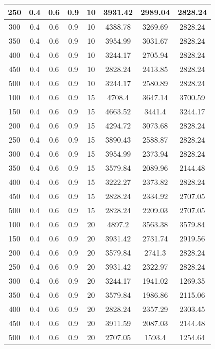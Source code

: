 \documentclass[a4paper, 12pt]{extreport}
\begin{document}
\begin{itemize}
\begin{longtable}{|c|c|c|c|c|c|c|c|}
			250 & 0.4 & 0.6 & 0.9 & 10 & 3931.42 & 2989.04 & 2828.24 \\\hline
			300 & 0.4 & 0.6 & 0.9 & 10 & 4388.78 & 3269.69 & 2828.24 \\\hline
			350 & 0.4 & 0.6 & 0.9 & 10 & 3954.99 & 3031.67 & 2828.24 \\\hline
			400 & 0.4 & 0.6 & 0.9 & 10 & 3244.17 & 2705.94 & 2828.24 \\\hline
			450 & 0.4 & 0.6 & 0.9 & 10 & 2828.24 & 2413.85 & 2828.24 \\\hline
			500 & 0.4 & 0.6 & 0.9 & 10 & 3244.17 & 2580.89 & 2828.24 \\\hline
			100 & 0.4 & 0.6 & 0.9 & 15 & 4708.4 & 3647.14 & 3700.59 \\\hline
			150 & 0.4 & 0.6 & 0.9 & 15 & 4663.52 & 3441.4 & 3244.17 \\\hline
			200 & 0.4 & 0.6 & 0.9 & 15 & 4294.72 & 3073.68 & 2828.24 \\\hline
			250 & 0.4 & 0.6 & 0.9 & 15 & 3890.43 & 2588.87 & 2828.24 \\\hline
			300 & 0.4 & 0.6 & 0.9 & 15 & 3954.99 & 2373.94 & 2828.24 \\\hline
			350 & 0.4 & 0.6 & 0.9 & 15 & 3579.84 & 2089.96 & 2144.48 \\\hline
			400 & 0.4 & 0.6 & 0.9 & 15 & 3222.27 & 2373.82 & 2828.24 \\\hline
			450 & 0.4 & 0.6 & 0.9 & 15 & 2828.24 & 2334.92 & 2707.05 \\\hline
			500 & 0.4 & 0.6 & 0.9 & 15 & 2828.24 & 2209.03 & 2707.05 \\\hline
			100 & 0.4 & 0.6 & 0.9 & 20 & 4897.2 & 3563.38 & 3579.84 \\\hline
			150 & 0.4 & 0.6 & 0.9 & 20 & 3931.42 & 2731.74 & 2919.56 \\\hline
			200 & 0.4 & 0.6 & 0.9 & 20 & 3579.84 & 2741.3 & 2828.24 \\\hline
			250 & 0.4 & 0.6 & 0.9 & 20 & 3931.42 & 2322.97 & 2828.24 \\\hline
			300 & 0.4 & 0.6 & 0.9 & 20 & 3244.17 & 1941.02 & 1269.35 \\\hline
			350 & 0.4 & 0.6 & 0.9 & 20 & 3579.84 & 1986.86 & 2115.06 \\\hline
			400 & 0.4 & 0.6 & 0.9 & 20 & 2828.24 & 2357.29 & 2303.45 \\\hline
			450 & 0.4 & 0.6 & 0.9 & 20 & 3911.59 & 2087.03 & 2144.48 \\\hline
			500 & 0.4 & 0.6 & 0.9 & 20 & 2707.05 & 1593.4 & 1254.64 \\\hline

\end{longtable}
\end{itemize}
\end{document}
